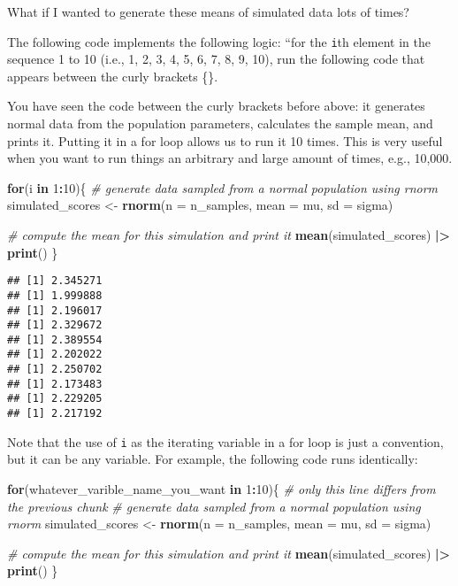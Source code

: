 \documentclass[
]{article}
\newenvironment{Shaded}{\begin{snugshade}}{\end{snugshade}}
\newcommand{\AttributeTok}[1]{\textcolor[rgb]{0.13,0.29,0.53}{#1}}
\newcommand{\CommentTok}[1]{\textcolor[rgb]{0.56,0.35,0.01}{\textit{#1}}}
\newcommand{\ControlFlowTok}[1]{\textcolor[rgb]{0.13,0.29,0.53}{\textbf{#1}}}
\newcommand{\DecValTok}[1]{\textcolor[rgb]{0.00,0.00,0.81}{#1}}
\newcommand{\FunctionTok}[1]{\textcolor[rgb]{0.13,0.29,0.53}{\textbf{#1}}}
\newcommand{\NormalTok}[1]{#1}
\newcommand{\OtherTok}[1]{\textcolor[rgb]{0.56,0.35,0.01}{#1}}
\newcommand{\SpecialCharTok}[1]{\textcolor[rgb]{0.81,0.36,0.00}{\textbf{#1}}}
\begin{document}
What if I wanted to generate these means of simulated data lots of
times?

The following code implements the following logic: ``for the
\texttt{i}th element in the sequence 1 to 10 (i.e., 1, 2, 3, 4, 5, 6, 7,
8, 9, 10), run the following code that appears between the curly
brackets \{\}.

You have seen the code between the curly brackets before above: it
generates normal data from the population parameters, calculates the
sample mean, and prints it. Putting it in a for loop allows us to run it
10 times. This is very useful when you want to run things an arbitrary
and large amount of times, e.g., 10,000.

\begin{Shaded}
\begin{Highlighting}[]
\ControlFlowTok{for}\NormalTok{(i }\ControlFlowTok{in} \DecValTok{1}\SpecialCharTok{:}\DecValTok{10}\NormalTok{)\{}
  \CommentTok{\# generate data sampled from a normal population using rnorm}
\NormalTok{  simulated\_scores }\OtherTok{\textless{}{-}} 
    \FunctionTok{rnorm}\NormalTok{(}\AttributeTok{n =}\NormalTok{ n\_samples, }
          \AttributeTok{mean =}\NormalTok{ mu, }
          \AttributeTok{sd =}\NormalTok{ sigma)}
  
  \CommentTok{\# compute the mean for this simulation and print it}
  \FunctionTok{mean}\NormalTok{(simulated\_scores) }\SpecialCharTok{|\textgreater{}} 
    \FunctionTok{print}\NormalTok{()}
\NormalTok{\}}
\end{Highlighting}
\end{Shaded}

\begin{verbatim}
## [1] 2.345271
## [1] 1.999888
## [1] 2.196017
## [1] 2.329672
## [1] 2.389554
## [1] 2.202022
## [1] 2.250702
## [1] 2.173483
## [1] 2.229205
## [1] 2.217192
\end{verbatim}

Note that the use of \texttt{i} as the iterating variable in a for loop
is just a convention, but it can be any variable. For example, the
following code runs identically:

\begin{Shaded}
\begin{Highlighting}[]
\ControlFlowTok{for}\NormalTok{(whatever\_varible\_name\_you\_want }\ControlFlowTok{in} \DecValTok{1}\SpecialCharTok{:}\DecValTok{10}\NormalTok{)\{ }\CommentTok{\# only this line differs from the previous chunk}
  \CommentTok{\# generate data sampled from a normal population using rnorm}
\NormalTok{  simulated\_scores }\OtherTok{\textless{}{-}} 
    \FunctionTok{rnorm}\NormalTok{(}\AttributeTok{n =}\NormalTok{ n\_samples, }
          \AttributeTok{mean =}\NormalTok{ mu, }
          \AttributeTok{sd =}\NormalTok{ sigma)}
  
  \CommentTok{\# compute the mean for this simulation and print it}
  \FunctionTok{mean}\NormalTok{(simulated\_scores) }\SpecialCharTok{|\textgreater{}} 
    \FunctionTok{print}\NormalTok{()}
\NormalTok{\}}
\end{Highlighting}
\end{Shaded}
\end{document}
